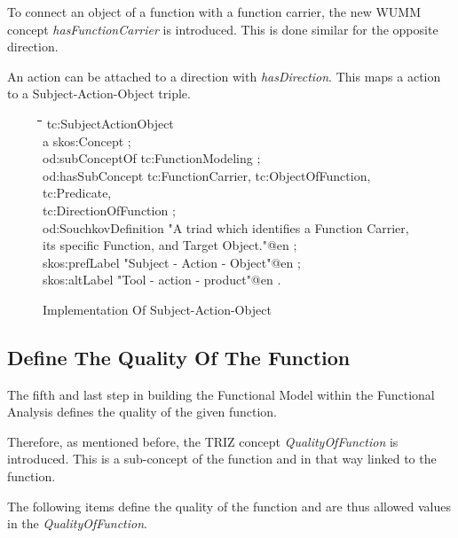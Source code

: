 \documentclass[11pt,a4paper]{article}
\newenvironment{code}{\tt \begin{tabbing}
\hskip12pt\=\hskip12pt\=\hskip12pt\=\hskip12pt\=\hskip5cm\=\hskip5cm\=\kill}
{\end{tabbing}}
\begin{document}
To connect an object of a function with a function carrier, the new WUMM
concept \textit{hasFunctionCarrier} is introduced.  This is done similar for
the opposite direction.

An action can be attached to a direction with \textit{hasDirection}.  This
maps a action to a Subject-Action-Object triple.

\begin{figure}[ht]
  \centering
  \begin{code}
    tc:SubjectActionObject\\
    \> a skos:Concept ;\\
    \> od:subConceptOf tc:FunctionModeling ;\\
    \> od:hasSubConcept tc:FunctionCarrier, tc:ObjectOfFunction, tc:Predicate,\\
    \> \> tc:DirectionOfFunction ;\\
    \> od:SouchkovDefinition "A triad which identifies a Function Carrier,\\
    \> \> its specific Function, and Target Object."@en ;\\
    \> skos:prefLabel "Subject - Action - Object"@en ;\\
    \> skos:altLabel "Tool - action - product"@en .
  \end{code}
  \caption{Implementation Of Subject-Action-Object}
  \label{fig:implementation_subject_action_object}
\end{figure}

\subsection{Define The Quality Of The Function}
\label{subsec:quality_function}

The fifth and last step in building the Functional Model within the Functional
Analysis defines the quality of the given function.

Therefore, as mentioned before, the TRIZ concept \textit{QualityOfFunction} is
introduced.  This is a sub-concept of the function and in that way linked to
the function.

The following items define the quality of the function and are thus allowed
values in the \textit{QualityOfFunction}.
\end{document}
